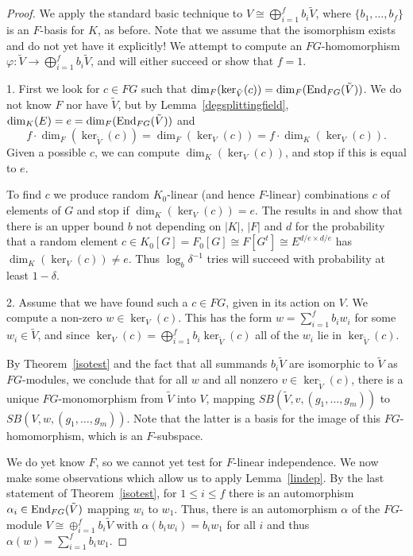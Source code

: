\begin{proof}
We apply the standard basic technique to 
$V \cong \bigoplus_{i=1}^f b_i\tilde{V}$, 
where $\{b_1, \ldots, b_f\}$ is an $F$-basis for $K$, as before.
Note that we assume that  the isomorphism exists and do not yet
have it explicitly! 
We attempt to compute an $FG$-homomorphism
$\varphi : \tilde{V} \to \bigoplus_{i=1}^f b_i\tilde{V}$, 
and will either succeed or show that $f = 1$. 

1. First we look for $c \in FG$ such that
$\dim_F(\ker_{\tilde V}(c)) = \dim_F(\End_{FG}(\tilde V))$. 
We do not know $F$ nor have $\tilde V$, 
but by Lemma~\ref{degsplittingfield}, $\dim_K(E) = e = 
\dim_F(\End_{FG}(\tilde V))$ and 
\[f \cdot \dim_F(\ker_{\tilde V}(c)) = \dim_F(\ker_V(c)) =
f \cdot \dim_K(\ker_V(c)).\] Given a possible $c$, 
we can compute $\dim_K(\ker_V(c))$, and stop if this is equal to $e$.

To find $c$ we produce random $K_0$-linear 
(and hence $F$-linear) combinations $c$ of elements of $G$
and stop if $\dim_K(\ker_V(c)) = e$. 
 The results in \cite{MeatAxeHoltRees} and \cite{IL}
    show that there is an upper bound $b$ not depending on $|K|$, $|F|$ and 
    $d$ for
    the probability that a random element 
    $c \in K_0[G] = F_0[G] \cong F[G^t] \cong E^{d/e \times d/e}$ has
    $\dim_{K}(\ker_V(c)) \neq e$. Thus $\log_b \delta^{-1}$ 
    tries will succeed with probability at least $1 - \delta$.  


2. Assume that we have found such a $c \in FG$, given in its action on $V$.
We compute a non-zero $w \in \ker_V(c)$.
This has the form $w = \sum_{i=1}^f b_i w_i$
for some $w_i \in \tilde{V}$, and since $\ker_V(c) = \bigoplus_{i=1}^f b_i \ker_{\tilde{V}}(c)$
 all of the $w_i$
lie in $\ker_{\tilde{V}}(c)$.

By Theorem~\ref{isotest} and the fact that
all summands $b_i \tilde{V}$ are isomorphic to $\tilde{V}$
as $FG$-modules, we conclude that for 
all $w$ and all nonzero $v \in \ker_{\tilde{V}}(c)$, 
there is a unique $FG$-monomorphism from $\tilde{V}$ into $V$,  mapping
$SB(\tilde{V},v,(g_1,\ldots,g_m))$ to $SB(V,w,(g_1,\ldots,g_m))$.
Note that the latter is a basis for the image of this $FG$-homomorphism, which is an $F$-subspace. 

We do yet know $F$, so we cannot yet
 test for $F$-linear independence. 
We now make some observations which allow us  to apply Lemma~\ref{lindep}. 
By the last statement of
Theorem~\ref{isotest}, for $1 \leq i \leq f$
there is an automorphism $\alpha_i \in \End_{FG}(\tilde{V})$
mapping $w_i$ to $w_1$. Thus, there is an automorphism $\alpha$
of the $FG$-module $V \cong \oplus_{i = 1}^f b_i \tilde{V}$ 
with $\alpha(b_i w_i) = b_i w_1$ for all $i$ and thus
$\alpha(w) = \sum_{i=1}^f b_i w_1$.


\end{proof}
